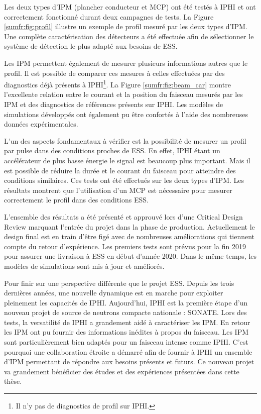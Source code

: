 Les deux types d’IPM (plancher conducteur et MCP) ont été testés à IPHI et ont correctement fonctionné durant deux campagnes de tests. La Figure \ref{sumfr:fig:profil} illustre un exemple de profil mesuré par les deux types d’IPM. Une complète caractérisation des détecteurs a été effectuée afin de sélectionner le système de détection le plus adapté aux besoins de ESS.


Les IPM permettent également de mesurer plusieurs informations autres que le profil. Il est possible de comparer ces mesures à celles effectuées par des diagnostics déjà présents à IPHI\footnote{Il n’y pas de diagnostics de profil sur IPHI.}. La Figure \ref{sumfr:fig:beam_car} montre l'excellente relation entre le courant et la position du faisceau mesurés par les IPM et des diagnostics de références présents sur IPHI. Les modèles de simulations développés ont également pu être confortés à l’aide des nombreuses données expérimentales.




L'un des aspects fondamentaux à vérifier est la possibilité de mesurer un profil par pulse dans des conditions proches de ESS. En effet, IPHI étant un accélérateur de plus basse énergie le signal est beaucoup plus important. Mais il est possible de réduire la durée et le courant du faisceau pour atteindre des conditions similaires. Ces tests ont été effectués sur les deux types d’IPM. Les résultats montrent que l’utilisation d’un MCP est nécessaire pour mesurer correctement le profil dans des conditions ESS. 

L’ensemble des résultats a été présenté et approuvé lors d’une Critical Design Review marquant l’entrée du projet dans la phase de production. Actuellement le design final est en train d’être figé avec de nombreuses améliorations qui tiennent compte du retour d’expérience. Les premiers tests sont prévus pour la fin 2019 pour assurer une livraison à ESS en début d’année 2020. Dans le même temps, les modèles de simulations sont mis à jour et améliorés.

Pour finir sur une perspective différente que le projet ESS. Depuis les trois dernières années, une nouvelle dynamique est en marche pour exploiter pleinement les capacités de IPHI. Aujourd'hui, IPHI est la première étape d'un nouveau projet de source de neutrons compacte nationale : SONATE.
Lors des tests, la versatilité de IPHI a grandement aidé à caractériser les IPM. En retour les IPM ont pu fournir des informations inédites à propos du faisceau. Les IPM sont particulièrement bien adaptés pour un faisceau intense comme IPHI. C'est pourquoi une collaboration étroite a démarré afin de fournir à IPHI un ensemble d'IPM permettant de répondre aux besoins présents et futurs. Ce nouveau projet va grandement bénéficier des études et des expériences présentées dans cette thèse.